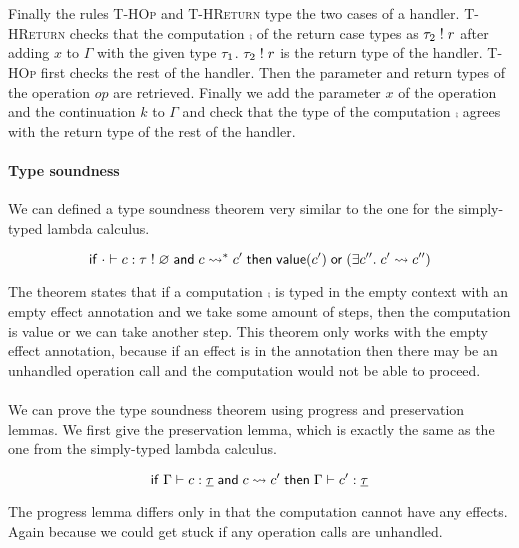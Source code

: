 {\\\\
Finally the rules \textsc{T-HOp} and \textsc{T-HReturn} type the two cases of a handler.
\textsc{T-HReturn} checks that the computation $\comp$ of the return case types as $\tau_2 \; ! \; r$ after adding $x$ to $\Gamma$ with the given type $\tau_1$. $\tau_2 \; ! \; r$ is the return type of the handler.
\textsc{T-HOp} first checks the rest of the handler. Then the parameter and return types of the operation $op$ are retrieved.
Finally we add the parameter $x$ of the operation and the continuation $k$ to $\Gamma$ and check that the type of the computation $\comp$ agrees with the return type of the rest of the handler.

\paragraph{Type soundness}
We can defined a type soundness theorem very similar to the one for the simply-typed lambda calculus.

\begin{theorem}
\[
	\mathsf{if}\;
		\cdot \vdash c : \tau \; ! \; \varnothing
		\;\mathsf{and}\;
		c \rightsquigarrow^* c'
	\;\mathsf{then}\;
		\mathsf{value}(c')
		\;\mathsf{or}\;
		(\exists c''.\; c' \rightsquigarrow c'')
\]
\end{theorem}

The theorem states that if a computation $\comp$ is typed in the empty context with an empty effect annotation and we take some amount of steps, then the computation is value or we can take another step.
This theorem only works with the empty effect annotation, because if an effect is in the annotation then there may be an unhandled operation call and the computation would not be able to proceed.
\\\\
We can prove the type soundness theorem using progress and preservation lemmas.
We first give the preservation lemma, which is exactly the same as the one from the simply-typed lambda calculus.

\begin{lemma}[Preservation]
\[
	\mathsf{if}\;
		\Gamma \vdash c : \underline{\tau}
		\;\mathsf{and}\;
		c \rightsquigarrow c'
	\;\mathsf{then}\;
		\Gamma \vdash c' : \underline{\tau}
\]
\end{lemma}

The progress lemma differs only in that the computation cannot have any effects.
Again because we could get stuck if any operation calls are unhandled.

}
